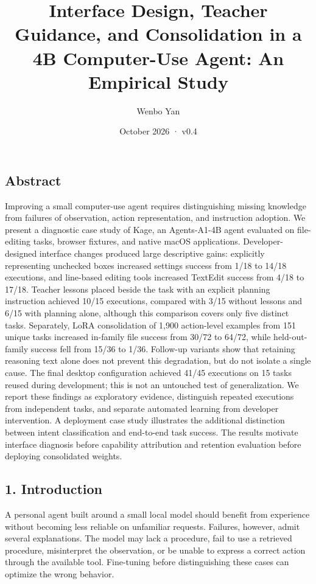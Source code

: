 \documentclass[
  10pt,
]{article}
\title{Interface Design, Teacher Guidance, and Consolidation in a 4B
Computer-Use Agent: An Empirical Study}
\author{Wenbo Yan}
\date{October 2026 · v0.4}
\begin{document}
\maketitle

\subsection{Abstract}\label{abstract}

Improving a small computer-use agent requires distinguishing missing
knowledge from failures of observation, action representation, and
instruction adoption. We present a diagnostic case study of Kage, an
Agents-A1-4B agent evaluated on file-editing tasks, browser fixtures,
and native macOS applications. Developer-designed interface changes
produced large descriptive gains: explicitly representing unchecked
boxes increased settings success from 1/18 to 14/18 executions, and
line-based editing tools increased TextEdit success from 4/18 to 17/18.
Teacher lessons placed beside the task with an explicit planning
instruction achieved 10/15 executions, compared with 3/15 without
lessons and 6/15 with planning alone, although this comparison covers
only five distinct tasks. Separately, LoRA consolidation of 1,900
action-level examples from 151 unique tasks increased in-family file
success from 30/72 to 64/72, while held-out-family success fell from
15/36 to 1/36. Follow-up variants show that retaining reasoning text
alone does not prevent this degradation, but do not isolate a single
cause. The final desktop configuration achieved 41/45 executions on 15
tasks reused during development; this is not an untouched test of
generalization. We report these findings as exploratory evidence,
distinguish repeated executions from independent tasks, and separate
automated learning from developer intervention. A deployment case study
illustrates the additional distinction between intent classification and
end-to-end task success. The results motivate interface diagnosis before
capability attribution and retention evaluation before deploying
consolidated weights.

\subsection{1. Introduction}\label{introduction}

A personal agent built around a small local model should benefit from
experience without becoming less reliable on unfamiliar requests.
Failures, however, admit several explanations. The model may lack a
procedure, fail to use a retrieved procedure, misinterpret the
observation, or be unable to express a correct action through the
available tool. Fine-tuning before distinguishing these cases can
optimize the wrong behavior.
\end{document}
